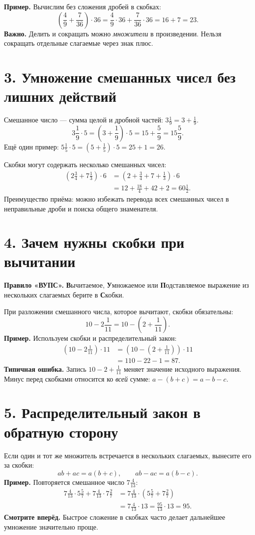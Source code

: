 \documentclass[a4paper,12pt]{article}
\newcommand{\sect}[1]{\Needspace{8\baselineskip}\section*{\color{darkaccent}#1}\vspace{-2mm}\noindent{\color{softline}\rule{\linewidth}{0.5pt}}\vspace{1mm}}
\newcommand{\markkey}[1]{\textcolor{darkaccent}{\textbf{#1}}}
\begin{document}
\markkey{Пример.} Вычислим без сложения дробей в скобках:
\[
\left(\frac49+\frac7{36}\right)\cdot36
=\frac49\cdot36+\frac7{36}\cdot36
=16+7=\boxed{23}.
\]
\markkey{Важно.} Делить и сокращать можно \emph{множители} в произведении. Нельзя сокращать отдельные слагаемые через знак плюс.

\sect{3. Умножение смешанных чисел без лишних действий}
Смешанное число --- сумма целой и дробной частей: \(3\frac19=3+\frac19\).
\[
3\frac19\cdot5
=\left(3+\frac19\right)\cdot5
=15+\frac59
=\boxed{15\frac59}.
\]
Ещё один пример: \(\displaystyle5\frac15\cdot5=(5+\frac15)\cdot5=25+1=\boxed{26}.\)

Скобки могут содержать несколько смешанных чисел:
\[
\begin{aligned}
\left(2\frac34+7\frac13\right)\cdot6
&=\left(2+\frac34+7+\frac13\right)\cdot6\\
&=12+\frac{18}{4}+42+2
=\boxed{60\frac12}.
\end{aligned}
\]
Преимущество приёма: можно избежать перевода всех смешанных чисел в неправильные дроби и поиска общего знаменателя.

\sect{4. Зачем нужны скобки при вычитании}
\markkey{Правило «ВУПС».} \textbf{В}ычитаемое, \textbf{У}множаемое или \textbf{П}одставляемое выражение из нескольких слагаемых берите в \textbf{С}кобки.

При разложении смешанного числа, которое вычитают, скобки обязательны:
\[
10-2\frac1{11}=10-\left(2+\frac1{11}\right).
\]
\markkey{Пример.} Используем скобки и распределительный закон:
\[
\begin{aligned}
\left(10-2\frac1{11}\right)\cdot11
&=\left(10-\left(2+\frac1{11}\right)\right)\cdot11\\
&=110-22-1=\boxed{87}.
\end{aligned}
\]
\markkey{Типичная ошибка.} Запись \(10-2+\frac1{11}\) меняет значение исходного выражения. Минус перед скобками относится ко \emph{всей} сумме: \(a-(b+c)=a-b-c\).

\sect{5. Распределительный закон в обратную сторону}
Если один и тот же множитель встречается в нескольких слагаемых, вынесите его за скобки:
\[
\boxed{ab+ac=a(b+c),\qquad ab-ac=a(b-c).}
\]
\markkey{Пример.} Повторяется смешанное число \(7\frac4{13}\):
\[
\begin{aligned}
7\frac4{13}\cdot5\frac57+7\frac4{13}\cdot7\frac27
&=7\frac4{13}\cdot\left(5\frac57+7\frac27\right)\\
&=7\frac4{13}\cdot13
=\frac{95}{13}\cdot13=\boxed{95}.
\end{aligned}
\]
\markkey{Смотрите вперёд.} Быстрое сложение в скобках часто делает дальнейшее умножение значительно проще.
\end{document}
